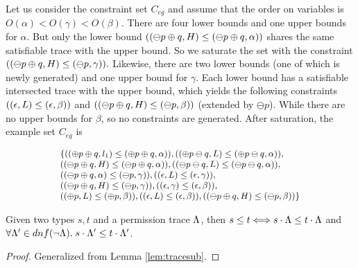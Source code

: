 {{{Let us consider the constraint set $C_{eg}$ and assume that the order on variables is $O(\alpha) < O (\gamma) < O (\beta)$. There are four lower bounds and one upper bounds for $\alpha$. But only the lower bound $((\ominus p\oplus q,H)\leq(\ominus p\oplus q,\alpha))$ shares the same satisfiable trace with the upper bound.
So we saturate the set with the constraint $((\ominus p\oplus q,H)\leq(\ominus p,\gamma)).$
Likewise, there are two lower bounds (one of which is newly generated) and one upper bound for $\gamma$. Each lower bound has a satisfiable intersected trace with the upper bound, which yields the following constraints $((\epsilon,L)\leq(\epsilon,\beta))$ and $((\ominus p\oplus q,H)\leq(\ominus p,\beta))$ (extended by $\ominus p$).
While there are no upper bounds for $\beta$, so no constraints are generated.
After saturation, the example set $C_{eg}$ is

\[
{\small
\begin{array}{l}
\{((\oplus p\oplus q,l_1)\leq(\oplus p\oplus q,\alpha)), ((\oplus p\ominus q,L)\leq(\oplus p\ominus q,\alpha)), \\
((\ominus p\oplus q,H)\leq(\ominus p\oplus q,\alpha)),
((\ominus p\ominus q,L)\leq(\ominus p\ominus q,\alpha)),\\
((\ominus p\oplus q,\alpha)\leq(\ominus p,\gamma)),
((\epsilon,L)\leq(\epsilon,\gamma)),\\
((\ominus p\oplus q,H)\leq(\ominus p,\gamma)),
((\epsilon,\gamma)\leq(\epsilon,\beta)), \\
((\oplus p,L)\leq(\oplus p,\beta)),
((\epsilon,L)\leq(\epsilon,\beta)),
((\ominus p\oplus q,H)\leq(\ominus p,\beta))
\}
\end{array}
}
\]



\begin{lemma}\label{lem:tracesub1}
Given two types $s,t$ and a permission trace $\Lambda$, then
$s\leq t\Longleftrightarrow s\cdot\Lambda \leq t\cdot\Lambda$ and $\forall \Lambda' \in dnf(\neg\Lambda).\; s\cdot \Lambda' \leq t\cdot\Lambda'$.
\end{lemma}
\begin{proof}
Generalized from Lemma \ref{lem:tracesub}.
\end{proof}


}}}
